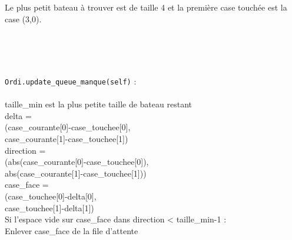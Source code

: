 \begin{frame}
Le plus petit bateau à trouver est de taille 4 et la première case touchée est la case (3,0). \\~\\
\begin{center}

\\~\\
\end{center}
\end{frame}

{
\begin{frame}[allowframebreaks]
\texttt{Ordi.update\_queue\_manque(self)} :\\~\\

taille\_min est la plus petite taille de bateau restant\\
delta = \\
(case\_courante[0]-case\_touchee[0],\\
 case\_courante[1]-case\_touchee[1])\\
direction = \\
(abs(case\_courante[0]-case\_touchee[0]),\\
 abs(case\_courante[1]-case\_touchee[1]))\\
case\_face = \\
(case\_touchee[0]-delta[0],\\
 case\_touchee[1]-delta[1])\\
Si l'espace vide sur case\_face dans direction < taille\_min-1 :\\
Enlever case\_face de la file d'attente\\
\end{frame}
}

